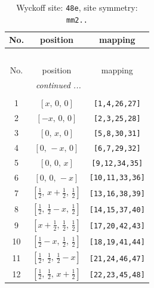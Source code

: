 \documentclass[fleqn,8pt]{jsarticle}
\begin{document}
\renewcommand{\arraystretch}{1.2}
\begin{longtable}{ccc}
\caption{Wyckoff site: {\tt 48e}, site symmetry: {\tt mm2..}}
 \\
 \hline \hline
No. & position & mapping \\ \hline \endfirsthead

\multicolumn{2}{l}{\tablename\ \thetable{}} \\
 \hline \hline
No. & position & mapping \\ \hline \endhead

 \hline \hline
\multicolumn{2}{r}{\footnotesize\it continued ...} \\ \endfoot

 \hline \hline
\multicolumn{2}{r}{} \\ \endlastfoot

1 & $\left[ x,\, 0,\, 0 \right]$ & {\tt [1,4,26,27]} \\ \hline
2 & $\left[ - x,\, 0,\, 0 \right]$ & {\tt [2,3,25,28]} \\ \hline
3 & $\left[ 0,\, x,\, 0 \right]$ & {\tt [5,8,30,31]} \\ \hline
4 & $\left[ 0,\, - x,\, 0 \right]$ & {\tt [6,7,29,32]} \\ \hline
5 & $\left[ 0,\, 0,\, x \right]$ & {\tt [9,12,34,35]} \\ \hline
6 & $\left[ 0,\, 0,\, - x \right]$ & {\tt [10,11,33,36]} \\ \hline
7 & $\left[ \frac{1}{2},\, x + \frac{1}{2},\, \frac{1}{2} \right]$ & {\tt [13,16,38,39]} \\ \hline
8 & $\left[ \frac{1}{2},\, \frac{1}{2} - x,\, \frac{1}{2} \right]$ & {\tt [14,15,37,40]} \\ \hline
9 & $\left[ x + \frac{1}{2},\, \frac{1}{2},\, \frac{1}{2} \right]$ & {\tt [17,20,42,43]} \\ \hline
10 & $\left[ \frac{1}{2} - x,\, \frac{1}{2},\, \frac{1}{2} \right]$ & {\tt [18,19,41,44]} \\ \hline
11 & $\left[ \frac{1}{2},\, \frac{1}{2},\, \frac{1}{2} - x \right]$ & {\tt [21,24,46,47]} \\ \hline
12 & $\left[ \frac{1}{2},\, \frac{1}{2},\, x + \frac{1}{2} \right]$ & {\tt [22,23,45,48]} \\
\end{longtable}
\renewcommand{\arraystretch}{1.2}
\end{document}
